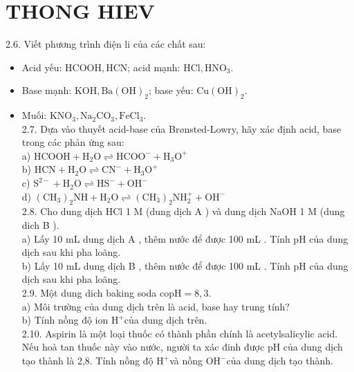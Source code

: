 \documentclass[10pt]{article}
\begin{document}
\section*{THONG HIEV}
2.6. Viết phương trình điện li của các chất sau:

\begin{itemize}
  \item Acid yếu: $\mathrm{HCOOH}, \mathrm{HCN}$; acid mạnh: $\mathrm{HCl}, \mathrm{HNO}_{3}$.
  \item Base mạnh: $\mathrm{KOH}, \mathrm{Ba}(\mathrm{OH})_{2}$; base yếu: $\mathrm{Cu}(\mathrm{OH})_{2}$.
  \item Muối: $\mathrm{KNO}_{3}, \mathrm{Na}_{2} \mathrm{CO}_{3}, \mathrm{FeCl}_{3}$.\\
2.7. Dựa vào thuyết acid-base của Brønsted-Lowry, hãy xác định acid, base trong các phản ứng sau:\\
a) $\mathrm{HCOOH}+\mathrm{H}_{2} \mathrm{O} \rightleftharpoons \mathrm{HCOO}^{-}+\mathrm{H}_{3} \mathrm{O}^{+}$\\
b) $\mathrm{HCN}+\mathrm{H}_{2} \mathrm{O} \rightleftharpoons \mathrm{CN}^{-}+\mathrm{H}_{3} \mathrm{O}^{+}$\\
c) $\mathrm{S}^{2-}+\mathrm{H}_{2} \mathrm{O} \rightleftharpoons \mathrm{HS}^{-}+\mathrm{OH}^{-}$\\
d) $\left(\mathrm{CH}_{3}\right)_{2} \mathrm{NH}+\mathrm{H}_{2} \mathrm{O} \rightleftharpoons\left(\mathrm{CH}_{3}\right)_{2} \mathrm{NH}_{2}^{+}+\mathrm{OH}^{-}$\\
2.8. Cho dung dịch HCl 1 M (dung dịch A ) và dung dịch NaOH 1 M (dung dich B ).\\
a) Lấy 10 mL dung dịch A , thêm nước để được 100 mL . Tính pH của dung dịch sau khi pha loãng.\\
b) Lấy 10 mL dung dịch B , thêm nước để được 100 mL . Tính pH của dung dịch sau khi pha loãng.\\
2.9. Một dung dich baking soda $\mathrm{co} \mathrm{pH}=8,3$.\\
a) Môi trường của dung dịch trên là acid, base hay trung tính?\\
b) Tính nồng độ ion $\mathrm{H}^{+}$của dung dịch trên.\\
2.10. Aspirin là một loại thuốc có thành phần chính là acetylsalicylic acid. Nếu hoà tan thuốc này vào nước, người ta xác đinh được pH của dung dịch tạo thành là 2,8. Tính nồng độ $\mathrm{H}^{+}$và nồng $\mathrm{OH}^{-}$của dung dịch tạo thành.
\end{itemize}
\end{document}
